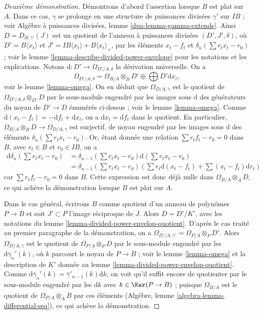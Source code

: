 \begin{proof}[Deuxième démonstration]
Démontrons d'abord l'assertion lorsque $B$ est plat sur $A$. Dans ce cas, $\gamma$
se prolonge en une structure de puissances divisées $\gamma'$ sur $IB$ ; voir
Algèbre à puissances divisées, lemme \ref{dpa-lemma-gamma-extends}.
Ainsi $D = D_{B, \gamma'}(J)$ est un quotient de
l'anneau à puissances divisées $(D', J', \delta)$, où $D' =  B\langle x_t \rangle$
et $J' = IB\langle x_t \rangle + B\langle x_t \rangle_{+}$,
par les éléments $x_t - f_t$ et $\delta_n(\sum r_t x_t - r_0)$ ; voir le
lemme \ref{lemma-describe-divided-power-envelope} pour les notations
et les explications. Notons $\text{d} : D' \to \Omega_{D'/A, \delta}$
la dérivation universelle. On a
$$
\Omega_{D'/A, \delta} =
\Omega_{B/A} \otimes_B D' \oplus \bigoplus D' \text{d}x_t,
$$
voir le lemme \ref{lemma-omega}. On en déduit que $\Omega_{D/A, \bar\gamma}$
est le quotient de $\Omega_{D'/A, \delta} \otimes_{D'} D$ par le sous-module
engendré par les images sous $\text{d}$ des générateurs du
noyau de $D' \to D$ énumérés ci-dessus ; voir le lemme \ref{lemma-omega}.
Comme $\text{d}(x_t - f_t) = - \text{d}f_t + \text{d}x_t$,
on a $\text{d}x_t = \text{d}f_t$ dans le quotient.
En particulier, $\Omega_{B/A} \otimes_B D \to \Omega_{D/A, \gamma}$
est surjectif, de noyau engendré par les images sous $\text{d}$
des éléments $\delta_n(\sum r_t x_t - r_0)$.
Or, étant donnée une relation $\sum r_tf_t - r_0 = 0$ dans $B$, avec
$r_t \in B$ et $r_0 \in IB$, on a
\begin{align*}
\text{d}\delta_n(\sum r_t x_t - r_0)
& =
\delta_{n - 1}(\sum r_t x_t - r_0)\text{d}(\sum r_t x_t - r_0)
\\
& =
\delta_{n - 1}(\sum r_t x_t - r_0)
\left(
\sum r_t\text{d}(x_t - f_t) + \sum (x_t - f_t)\text{d}r_t
\right)
\end{align*}
car $\sum r_tf_t - r_0 = 0$ dans $B$. Cette expression est donc déjà nulle dans
$\Omega_{B/A} \otimes_A D$, ce qui achève la démonstration lorsque $B$ est plat sur $A$.

\medskip\noindent
Dans le cas général, écrivons $B$ comme quotient d'un anneau de polynômes
$P \to B$ et soit $J' \subset P$ l'image réciproque de $J$. Alors
$D = D'/K'$, avec les notations du
lemme \ref{lemma-divided-power-envelop-quotient}.
D'après le cas traité au premier paragraphe de la démonstration, on a
$\Omega_{D'/A, \bar\gamma'} = \Omega_{P/A} \otimes_P D'$. Alors
$\Omega_{D/A, \bar \gamma}$ est le quotient de $\Omega_{P/A} \otimes_P D$
par le sous-module engendré par les $\text{d}\bar\gamma_n'(k)$, où $k$
parcourt le noyau de $P \to B$ ; voir le
lemme \ref{lemma-omega} et la description de $K'$ donnée au
lemme \ref{lemma-divided-power-envelop-quotient}. Comme
$\text{d}\bar\gamma_n'(k) = \bar\gamma'_{n - 1}(k)\text{d}k$, on voit
qu'il suffit encore de quotienter par le sous-module engendré par les
$\text{d}k$ avec $k \in \Ker(P \to B)$ ; puisque $\Omega_{B/A}$
est le quotient de $\Omega_{P/A} \otimes_A B$ par ces éléments
(Algèbre, lemme \ref{algebra-lemma-differential-seq}), ce qui achève la démonstration.
\end{proof}

